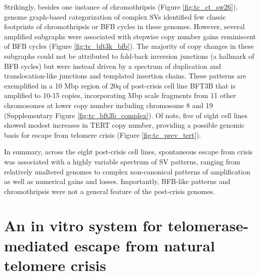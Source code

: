 \documentclass[phd,tocprelim]{cornell}
\renewcommand{\caption}[1]{\singlespacing\hangcaption{#1}\normalspacing}
\begin{document}
Strikingly, besides one instance of chromothripsis (Figure \ref{fig:tc_ct_sw26}), genome graph-based categorization of complex SVs \cite{Hadi2020-um} identified few classic footprints of chromothripsis or BFB cycles in these genomes. However, several amplified subgraphs were associated with stepwise copy number gains reminiscent of BFB cycles (Figure \ref{fig:tc_bft3k_bfb}). The majority of copy changes in these subgraphs could not be attributed to fold-back inversion junctions (a hallmark of BFB cycles) but were instead driven by a spectrum of duplication and translocation-like junctions and templated insertion chains. These patterns are exemplified in a 10 Mbp region of 20q of post-crisis cell line BFT3B that is amplified to 10-15 copies, incorporating Mbp scale fragments from 11 other chromosomes at lower copy number including chromosome 8 and 19 (Supplementary Figure \ref{fig:tc_bft3b_complex}). Of note, five of eight cell lines showed modest increases in TERT copy number, providing a possible genomic basis for escape from telomere crisis (Figure \ref{fig:tc_prev_tert}).

In summary, across the eight post-crisis cell lines, spontaneous escape from crisis was associated with a highly variable spectrum of SV patterns, ranging from relatively unaltered genomes to complex non-canonical patterns of amplification as well as numerical gains and losses. Importantly, BFB-like patterns and chromothripsis were not a general feature of the post-crisis genomes.

\section{An in vitro system for telomerase-mediated escape from natural telomere crisis}


\end{document}
